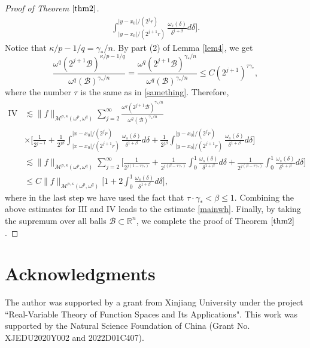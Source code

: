 \documentclass[preprint,10pt]{elsarticle}
\numberwithin{equation}{section}
\begin{document}
\begin{proof}[Proof of Theorem $\ref{thm2}$]
\begin{equation*}
\begin{split}
\int_{|y-x_0|/{(2^{j+1}r)}}^{|y-x_0|/{(2^jr)}}\frac{\omega_s(\delta)}{\delta^{1+\beta}}d\delta\bigg].
\end{split}
\end{equation*}
Notice that $\kappa/p-1/q={\gamma_*}/n$. By part (2) of Lemma \ref{lem4}, we get
\begin{equation*}
\frac{\omega^q(2^{j+1}\mathcal{B})^{\kappa/p-1/q}}{\omega^q(\mathcal{B})^{{\gamma_*}/n}}
=\frac{\omega^q(2^{j+1}\mathcal{B})^{{\gamma_*}/{n}}}{\omega^q(\mathcal{B})^{{\gamma_*}/n}}
\leq C(2^{j+1})^{\tau\gamma_{*}},
\end{equation*}
where the number $\tau$ is the same as in \eqref{samething}. Therefore,
\begin{equation*}
\begin{split}
\mathrm{IV}&\lesssim\|f\|_{\mathcal{M}^{p,\kappa}(\omega^p,\omega^q)}
\sum_{j=2}^\infty
\frac{\omega^q(2^{j+1}\mathcal{B})^{{\gamma_*}/{n}}}{\omega^q(\mathcal{B})^{{\gamma_*}/n}}\\
&\times\bigg[\frac{1}{2^{j-1}}+\frac{1}{2^{j\beta}}
\int_{|x-x_0|/{(2^{j+1}r)}}^{|x-x_0|/{(2^jr)}}\frac{\omega_s(\delta)}{\delta^{1+\beta}}d\delta
+\frac{1}{2^{j\beta}}
\int_{|y-x_0|/{(2^{j+1}r)}}^{|y-x_0|/{(2^jr)}}\frac{\omega_s(\delta)}{\delta^{1+\beta}}d\delta\bigg]\\
&\lesssim\|f\|_{\mathcal{M}^{p,\kappa}(\omega^p,\omega^q)}\sum_{j=2}^\infty
\bigg[\frac{1}{2^{j(1-\tau\gamma_{*})}}+\frac{1}{2^{j(\beta-\tau\gamma_{*})}}
\int_{0}^{1}\frac{\omega_s(\delta)}{\delta^{1+\beta}}d\delta
+\frac{1}{2^{j(\beta-\tau\gamma_{*})}}
\int_{0}^{1}\frac{\omega_s(\delta)}{\delta^{1+\beta}}d\delta\bigg]\\
&\leq C\|f\|_{\mathcal{M}^{p,\kappa}(\omega^p,\omega^q)}\bigg[1+2\int_0^1\frac{\omega_s(\delta)}{\delta^{1+\beta}}d\delta\bigg],
\end{split}
\end{equation*}
where in the last step we have used the fact that $\tau\cdot\gamma_{*}<\beta\leq1$. Combining the above estimates for $\mathrm{III}$ and $\mathrm{IV}$ leads to the estimate \eqref{mainwh}. Finally, by taking the supremum over all balls $\mathcal{B}\subset\mathbb R^n$, we complete the proof of Theorem $\ref{thm2}$.
\end{proof}

\section*{Acknowledgments}
The author was supported by a grant from Xinjiang University under the project ``Real-Variable Theory of Function Spaces and Its Applications". This work was supported by the Natural Science Foundation of China (Grant No. XJEDU2020Y002 and 2022D01C407).
\end{document}
